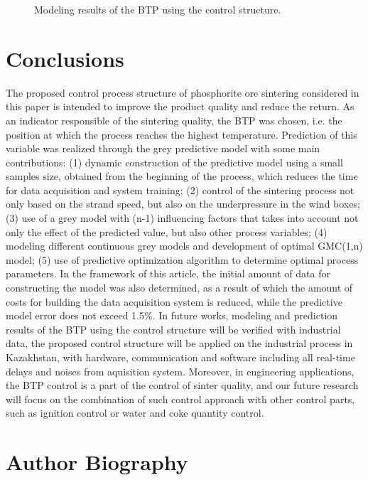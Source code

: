 \documentclass[AMS,STIX2COL]{WileyNJD-v2}
\begin{document}
\begin{figure}
\begin{subfigure}{.5\textwidth}
	\end{subfigure}
	\caption{Modeling results of the BTP using the control structure.}
	\label{fig:ControlResults}
\end{figure}
\section{Conclusions} \label{Conclusion}
The proposed control process structure of phosphorite ore sintering considered in this paper is intended to improve the product quality and reduce the return. As an indicator responsible of the sintering quality, the BTP was chosen, i.e. the position at which the process reaches the highest temperature. Prediction of this variable was realized through the grey predictive model with some main contributions: (1) dynamic construction of the predictive model using a small samples size, obtained from the beginning of the process, which reduces the time for data acquisition and system training; (2) control of the sintering process not only based on the strand speed, but also on the underpressure in the wind boxes; (3) use of a grey model with (n-1) influencing factors that takes into account not only the effect of the predicted value, but also other process variables; (4) modeling different continuous grey models and development of optimal GMC(1,n) model; (5) use of predictive optimization algorithm to determine optimal process parameters. In the framework of this article, the initial amount of data for constructing the model was also determined, as a result of which the amount of costs for building the data acquisition system is reduced, while the predictive model error does not exceed 1.5\%.
In future works, modeling and prediction results of the BTP using the control structure will be verified with industrial data, the proposed control structure will be applied on the industrial process in Kazakhstan, with  hardware, communication and  software including all real-time delays and noises from aquisition system. Moreover, in engineering applications, the BTP control is a part of the control of sinter quality, and our future research will focus on the combination of such control approach with other control parts, such as ignition control or water and coke quantity control.
\nocite{*}

\section*{Author Biography}
\end{document}
